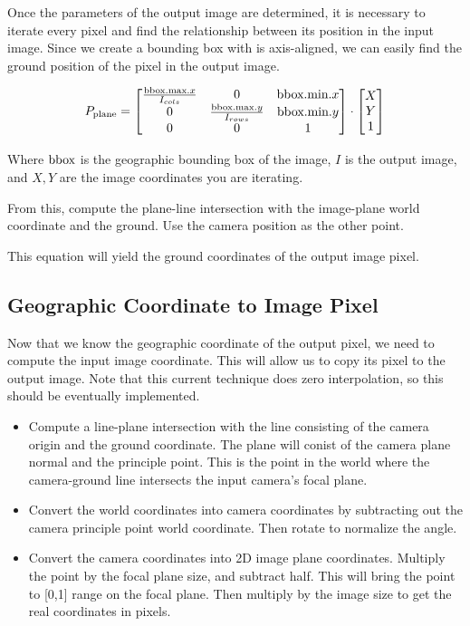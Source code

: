 Once the parameters of the output image are determined, it is necessary to iterate every pixel and find the relationship between its position in the input image. 
Since we create a bounding box with is axis-aligned, we can easily find the ground position of the pixel in the output image. 

\begin{equation}
P_{\textup{plane}} = \begin{bmatrix}
\frac{\textup{bbox.max}.x}{I_{cols}} & 0 & \textup{bbox.min}.x\\ 
 0 & \frac{\textup{bbox.max}.y}{I_{rows}} & \textup{bbox.min}.y\\ 
  0 & 0 & 1 
  \end{bmatrix}
  \cdot
  \begin{bmatrix}
  X \\
  Y \\
  1
  \end{bmatrix}
\end{equation}

Where $\textup{bbox}$ is the geographic bounding box of the image, $I$ is the output image, and $X,Y$ are the image coordinates you are iterating. 

From this, compute the plane-line intersection with the image-plane world coordinate and the ground.  Use the camera position as the other point. 

This equation will yield the ground coordinates of the output image pixel. 

\subsection*{Geographic Coordinate to Image Pixel}

Now that we know the geographic coordinate of the output pixel, we need to compute the input image coordinate.  This will allow us to copy its pixel to the output image. 
Note that this current technique does zero interpolation, so this should be eventually implemented. 

\begin{itemize}
\item Compute a line-plane intersection with the line consisting of the camera origin and the ground coordinate.  The plane will conist of the camera plane normal and
      the principle point. This is the point in the world where the camera-ground line intersects the input camera's focal plane. 
\item Convert the world coordinates into camera coordinates by subtracting out the camera principle point world coordinate.  Then rotate to normalize the angle. 
\item Convert the camera coordinates into 2D image plane coordinates.  Multiply the point by the focal plane size, and subtract half. This will bring the point to [0,1]
      range on the focal plane.  Then multiply by the image size to get the real coordinates in pixels. 
\end{itemize}


